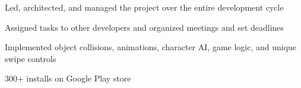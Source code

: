 \documentclass[]{peter_resume}
\begin{document}
\begin{minipage}[t]{0.74\textwidth}
\begin{tightemize}
\item Led, architected, and managed the project over the entire development cycle
\item Assigned tasks to other developers and organized meetings and set deadlines
\item Implemented object collisions, animations, character AI, game logic, and unique swipe controls
\item 300+ installs on Google Play store
\end{tightemize} 
\sectionsep

\begin{comment}
\runsubsection{Myonnaise}
\location{Hack the North hackathon project}
\begin{tightemize}
\item A desktop navigation menu for Windows using arm and hand gestures with Myo
\item Developed gesture recognition scripts in Lua for scrolling and overlay focus control
\end{tightemize} 
\sectionsep

\runsubsection{GeoChat}
\location{UofT Hacks hackathon project}
\begin{tightemize}
\item A location based social networking application for Android
\item Developed a NodeJS API and hosted on Heroku
\end{tightemize} 
\sectionsep

\centerline{\textbf{(Below are projects using my own custom Java framework, PCPC)}}
\vspace{0.4cm}


\runsubsection{Steganographer}
\location{Image steganography tool}
\begin{tightemize}
\item Encodes and decodes images and text within other images by bit manipulating RBG values
\end{tightemize}
\sectionsep

\runsubsection{Pathery}
\location{A "Find the longest path" game. Clone of Pathery.com}
\begin{tightemize}
\item Developed a custom JSON parser from scratch to read map info from Pathery.com
\item Implemented Breadth First Search to determine the shortest path
\end{tightemize}
\sectionsep
\end{comment}


\end{minipage} 
\end{document}
